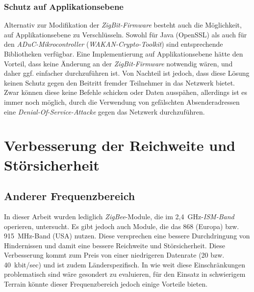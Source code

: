 \subsubsection{Schutz auf Applikationsebene}
Alternativ zur Modifikation der \emph{ZigBit-Firmware} besteht auch die Möglichkeit, auf Applikationsebene zu Verschlüsseln.
Sowohl für Java (OpenSSL) als auch für den \emph{ADuC-Mikrocontroller} (\emph{WAKAN-Crypto-Toolkit}) sind 
entsprechende Bibliotheken
verfügbar. Eine Implementierung auf Applikationsebene hätte den Vorteil, dass keine Änderung an der \emph{ZigBit-Firmware}
notwendig wären, und daher ggf. einfacher durchzuführen ist. Von Nachteil ist jedoch, dass diese Lösung keinen Schutz
gegen den Beitritt fremder Teilnehmer in das Netzwerk bietet. Zwar können diese keine Befehle schicken oder Daten ausspähen,
allerdings ist es immer noch möglich, durch die Verwendung von gefälschten Absenderadressen eine 
\emph{Denial-Of-Service-Attacke} gegen das Netzwerk durchzuführen. 

\section{Verbesserung der Reichweite und Störsicherheit}
\subsection{Anderer Frequenzbereich}
In dieser Arbeit wurden lediglich \emph{ZigBee}-Module, die im 2,4~GHz-\emph{ISM-Band} operieren, untersucht. Es gibt
jedoch auch Module, die das 868 (Europa) bzw. 915~MHz-Band (USA) nutzen. Diese versprechen eine bessere Durchdringung
von Hindernissen und damit eine bessere Reichweite und Störsicherheit. Diese Verbesserung kommt zum Preis von einer
niedrigeren Datenrate (20 bzw. 40~kbit/sec) und ist zudem Länderspezifisch. In wie weit diese Einschränkungen problematisch
sind wäre gesondert zu evaluieren, für den Einsatz in schwierigem Terrain könnte dieser Frequenzbereich jedoch einige
Vorteile bieten.

